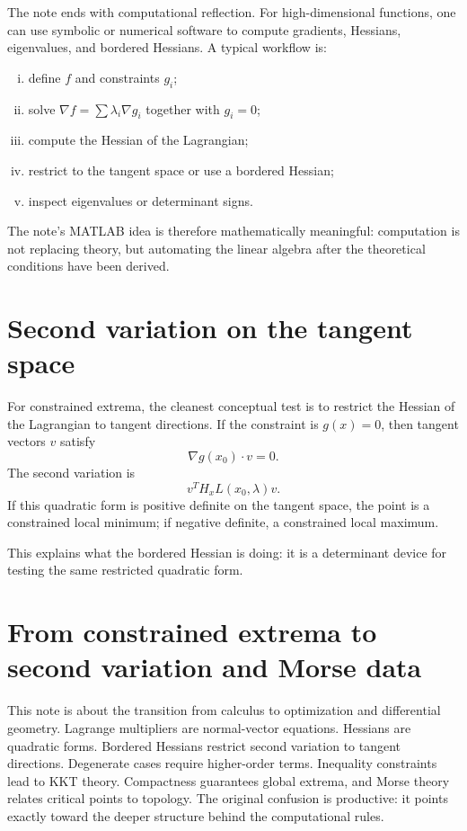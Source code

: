 The note ends with computational reflection.  For high-dimensional functions, one can use symbolic or numerical software to compute gradients, Hessians, eigenvalues, and bordered Hessians.  A typical workflow is:
\begin{enumerate}[(i)]
  \item define $f$ and constraints $g_i$;
  \item solve $\nabla f=\sum \lambda_i\nabla g_i$ together with $g_i=0$;
  \item compute the Hessian of the Lagrangian;
  \item restrict to the tangent space or use a bordered Hessian;
  \item inspect eigenvalues or determinant signs.
\end{enumerate}
The note's MATLAB idea is therefore mathematically meaningful: computation is not replacing theory, but automating the linear algebra after the theoretical conditions have been derived.


\section{Second variation on the tangent space}

For constrained extrema, the cleanest conceptual test is to restrict the Hessian of the Lagrangian to tangent directions.  If the constraint is \(g(x)=0\), then tangent vectors \(v\) satisfy
\[
  \nabla g(x_0)\cdot v=0.
\]
The second variation is
\[
  v^T H_xL(x_0,\lambda)v.
\]
If this quadratic form is positive definite on the tangent space, the point is a constrained local minimum; if negative definite, a constrained local maximum.

This explains what the bordered Hessian is doing: it is a determinant device for testing the same restricted quadratic form.

\section{From constrained extrema to second variation and Morse data}

This note is about the transition from calculus to optimization and differential geometry.  Lagrange multipliers are normal-vector equations.  Hessians are quadratic forms.  Bordered Hessians restrict second variation to tangent directions.  Degenerate cases require higher-order terms.  Inequality constraints lead to KKT theory.  Compactness guarantees global extrema, and Morse theory relates critical points to topology.  The original confusion is productive: it points exactly toward the deeper structure behind the computational rules.

